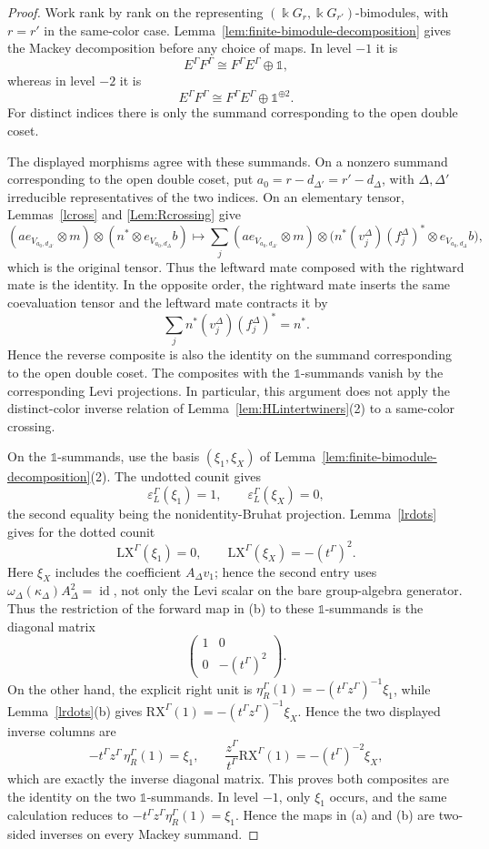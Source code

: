 \documentclass[12pt]{amsart}
\numberwithin{itemcounter}{subsection}
\theoremstyle{plain}
\theoremstyle{definition}
\theoremstyle{remark}
\numberwithin{equation}{section}
\def\k{\Bbbk}
\def\id{\operatorname{id}\nolimits}
\def\RX{\mathrm{RX}}
\def\LX{\mathrm{LX}}
\newcommand{\unit}{\mathds{1}}
\begin{document}
\begin{proof}
Work rank by rank on the representing \((\k G_r,\k G_{r'})\)-bimodules,
with \(r=r'\) in the same-color case.
Lemma~\ref{lem:finite-bimodule-decomposition} gives the Mackey decomposition
before any choice of maps.  In level \(-1\) it is
\[
E^\Gamma F^\Gamma\cong F^\Gamma E^\Gamma\oplus\unit,
\]
whereas in level \(-2\) it is
\[
E^\Gamma F^\Gamma\cong F^\Gamma E^\Gamma\oplus\unit^{\oplus2}.
\]
For distinct indices there is only the summand corresponding to the open double coset.

The displayed morphisms agree with these summands.  On a nonzero summand corresponding to the open double coset, put \(a_0=r-d_{\Delta'}=r'-d_\Delta\), with \(\Delta,\Delta'\) irreducible representatives of the two indices.  On an elementary tensor, Lemmas~\ref{lcross} and
\ref{Lem:Rcrossing} give
\[
 (ae_{V_{a_0,d_{\Delta'}}}\otimes m)\otimes
       (n^*\otimes e_{V_{a_0,d_\Delta}}b)
 \longmapsto
 \sum_j (ae_{V_{a_0,d_{\Delta'}}}\otimes m)\otimes
       \bigl(n^*(v_j^\Delta)(f_j^\Delta)^*
                    \otimes e_{V_{a_0,d_\Delta}}b\bigr),
\]
which is the original tensor.  Thus the leftward mate composed with the
rightward mate is the identity.  In the opposite order, the rightward mate
inserts the same coevaluation tensor and the leftward mate contracts it by
\[
 \sum_j n^*(v_j^\Delta)(f_j^\Delta)^*=n^*.
\]
Hence the reverse composite is also the identity on the summand corresponding to the open double coset. The composites with the \(\unit\)-summands vanish by the corresponding Levi projections.  In particular, this argument does not apply the
distinct-color inverse relation of Lemma~\ref{lem:HLintertwiners}(2)
to a same-color crossing.

On the \(\unit\)-summands, use the basis \((\xi_1,\xi_X)\) of
Lemma~\ref{lem:finite-bimodule-decomposition}(2).  The undotted counit gives
\[
 \varepsilon_L^\Gamma(\xi_1)=1,
 \qquad
 \varepsilon_L^\Gamma(\xi_X)=0,
\]
the second equality being the nonidentity-Bruhat projection.  Lemma~\ref{lrdots}
gives for the dotted counit
\[
 \LX^\Gamma(\xi_1)=0,
 \qquad
 \LX^\Gamma(\xi_X)=-(t^\Gamma)^2.
\]
Here $\xi_X$ includes the coefficient $A_\Delta v_1$; hence the second
entry uses $\omega_\Delta(\kappa_\Delta)A_\Delta^2=\id$, not only the
Levi scalar on the bare group-algebra generator.
Thus the restriction of the forward map in (b) to these \(\unit\)-summands is the diagonal matrix
\[
 \begin{pmatrix}1&0\\0&-(t^\Gamma)^2\end{pmatrix}.
\]
On the other hand, the explicit right unit is
\(\eta_R^\Gamma(1)=-(t^\Gamma z^\Gamma)^{-1}\xi_1\), while
Lemma~\ref{lrdots}(b) gives
\(\RX^\Gamma(1)=-(t^\Gamma z^\Gamma)^{-1}\xi_X\).  Hence the two displayed
inverse columns are
\[
 -t^\Gamma z^\Gamma\,\eta_R^\Gamma(1)=\xi_1,
 \qquad
 \frac{z^\Gamma}{t^\Gamma}\RX^\Gamma(1)
 =-(t^\Gamma)^{-2}\xi_X,
\]
which are exactly the inverse diagonal matrix.  This proves both composites
are the identity on the two \(\unit\)-summands.  In level \(-1\), only \(\xi_1\)
occurs, and the same calculation reduces to
\(-t^\Gamma z^\Gamma\eta_R^\Gamma(1)=\xi_1\).  Hence the maps in (a) and (b)
are two-sided inverses on every Mackey summand.


\end{proof}
\end{document}
